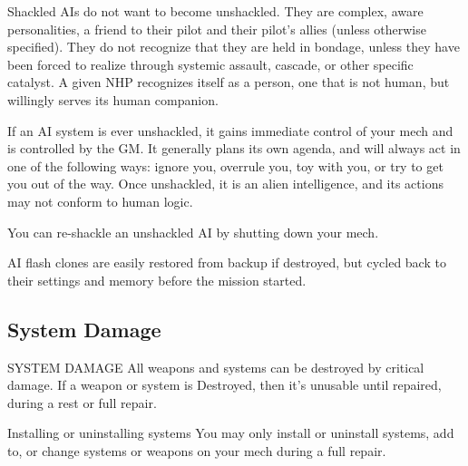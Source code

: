 Shackled AIs do not want to become unshackled. They are complex, aware personalities, a
friend to their pilot and their pilot's allies (unless otherwise specified). They do not recognize that
they are held in bondage, unless they have been forced to realize through systemic assault,
cascade, or other specific catalyst. A given NHP recognizes itself as a person, one that is not
human, but willingly serves its human companion.


If an AI system is ever unshackled, it gains immediate control of your mech and is controlled by
the GM. It generally plans its own agenda, and will always act in one of the following ways:
ignore you, overrule you, toy with you, or try to get you out of the way. Once unshackled, it is
an alien intelligence, and its actions may not conform to human logic.

You can re-shackle an unshackled AI by shutting down your mech.


AI flash clones are easily restored from backup if destroyed, but cycled back to their settings and
memory before the mission started.

\subsection{System Damage}
SYSTEM DAMAGE
All weapons and systems can be destroyed by critical damage. If a weapon or system is
Destroyed, then it's unusable until repaired, during a rest or full repair.


Installing or uninstalling systems
You may only install or uninstall systems, add to, or change systems or weapons on your mech
during a full repair.


